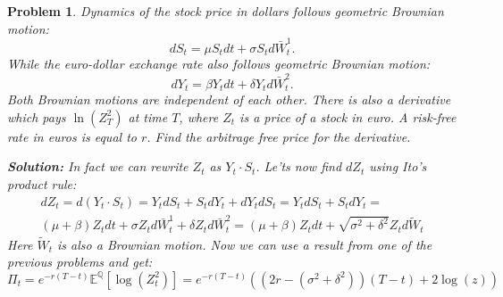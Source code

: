 \documentclass[a4paper, 12pt]{article}
\theoremstyle{problemstyle}
\newtheorem{problem}{Problem}[section]
\newenvironment{solution}
{\textit{\textbf{Solution:}}}
{}
\newcommand{\E}{\mathbb{E}}
\begin{document}
\begin{problem}
	Dynamics of the stock price in dollars follows geometric Brownian motion:
	\begin{equation}
	dS_t = \mu S_t dt + \sigma S_t d\bar{W}^1_t.
	\end{equation}
	While the euro-dollar exchange rate also follows geometric Brownian motion:
		\begin{equation}
	dY_t = \beta Y_t dt + \delta Y_t d\bar{W}^2_t.
	\end{equation}
	Both Brownian motions are independent of each other. There is also a derivative which pays $\ln(Z_T^2)$ at time $T$, where $Z_t$ is a price of a stock in euro. A risk-free rate in euros is equal to $r$.  Find the arbitrage free price for the derivative. 
	
	\begin{solution}
		In fact we can rewrite $Z_t$ as $Y_t \cdot S_t$. Le'ts now find $dZ_t$ using Ito's product rule:
		\begin{multline}
		dZ_t = d(Y_t \cdot S_t) = Y_t dS_t + S_t dY_t + dY_t dS_t =
		 Y_t dS_t + S_t dY_t  = \\
		 (\mu + \beta) Z_t dt + \sigma Z_t d\bar{W}^1_t + \delta Z_t d\bar{W}^2_t = (\mu + \beta) Z_t dt + \sqrt{\sigma^2 + \delta^2} Z_t d \tilde{W}_t
		\end{multline}
				Here $\tilde{W}_t$ is also a Brownian motion. Now we can use a result from one of the previous problems and get:
		\begin{equation}
		\Pi_t = e^{-r(T-t)}\E^{\mathbb{Q}}[\log(Z_t^2)] =
			e^{-r(T-t)}((2r  - (\sigma^2 + \delta^2))(T-t) + 2\log(z)) 
		\end{equation}
	\end{solution}
	
\end{problem}
\end{document}

